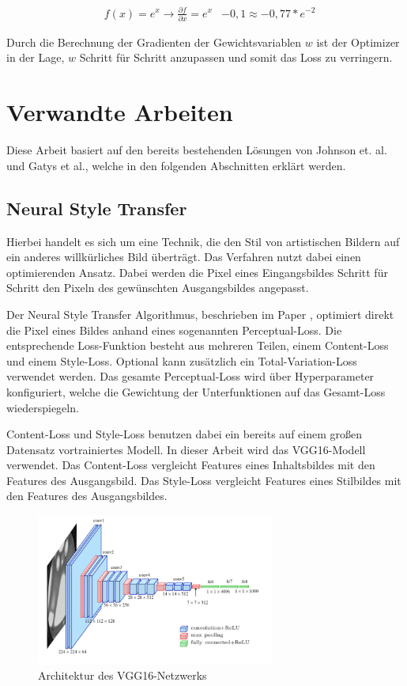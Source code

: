 \begin{align}
	& f(x) = e^{x} \rightarrow \frac{\partial f}{\partial x} = e^{x}
	& -0,1 \approx -0,77 * e^{-2}
\end{align}

Durch die Berechnung der Gradienten der Gewichtsvariablen $ w $ ist der Optimizer in der Lage, $ w $ Schritt für Schritt anzupassen und somit das Loss zu verringern.

\pagebreak

\section{Verwandte Arbeiten}

Diese Arbeit basiert auf den bereits bestehenden Lösungen von Johnson et. al. und Gatys et al., welche in den folgenden Abschnitten erklärt werden.

\subsection{Neural Style Transfer}
\label{sec:neural_style_transfer}

Hierbei handelt es sich um eine Technik, die den Stil von artistischen Bildern auf ein anderes willkürliches Bild überträgt.
Das Verfahren nutzt dabei einen optimierenden Ansatz. Dabei werden die Pixel eines Eingangsbildes Schritt für Schritt den Pixeln 
des gewünschten Ausgangsbildes angepasst. 

Der Neural Style Transfer Algorithmus, beschrieben im Paper \cite{DBLP:journals/corr/GatysEB15a}, optimiert direkt die Pixel eines Bildes anhand eines sogenannten Perceptual-Loss. Die entsprechende Loss-Funktion besteht aus mehreren Teilen, einem Content-Loss und einem Style-Loss. Optional kann zusätzlich ein Total-Variation-Loss verwendet werden. Das gesamte Perceptual-Loss wird über Hyperparameter konfiguriert, welche die Gewichtung der Unterfunktionen auf das Gesamt-Loss wiederspiegeln.

Content-Loss und Style-Loss benutzen dabei ein bereits auf einem großen Datensatz vortrainiertes Modell. In dieser Arbeit wird das VGG16-Modell \cite{DBLP:journals/corr/SimonyanZ14a} verwendet. Das Content-Loss vergleicht Features eines Inhaltsbildes mit den Features des Ausgangsbild. Das Style-Loss vergleicht Features eines Stilbildes mit den Features des Ausgangsbildes.

\begin{figure}[H]
	\centering
	\includegraphics[width=0.70\textwidth]{resources/content/vgg16.png}
	\caption{Architektur des VGG16-Netzwerks \cite{vgg16_img}}
	\label{img:vgg16_img}
\end{figure}

